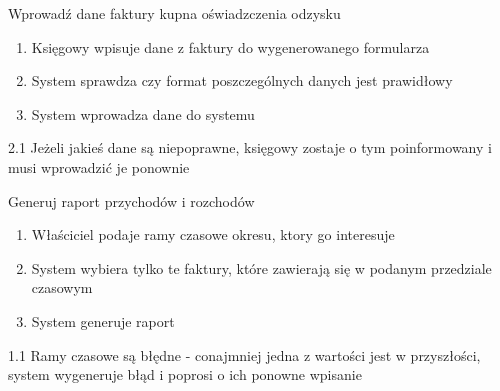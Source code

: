 	\begin{usecase}{Wprowadź dane faktury kupna oświadzczenia odzysku}
		\author{Arkadiusz Socha} 
		\maketitle
\begin{scenario}
 
			\begin{enumerate}
				\item Księgowy wpisuje dane z faktury do wygenerowanego formularza
				\item System sprawdza czy format poszczególnych danych jest prawidłowy
				\item System wprowadza dane do systemu
			\end{enumerate}
		\end{scenario}
\begin{extensions}
		2.1 Jeżeli jakieś dane są niepoprawne, księgowy zostaje o tym poinformowany i musi wprowadzić je ponownie
	\end{extensions}
\end{usecase}

	\begin{usecase}{Generuj raport przychodów i rozchodów}
		\author{Arkadiusz Socha} 
		\maketitle
\begin{scenario}
 
			\begin{enumerate}
				\item Właściciel podaje ramy czasowe okresu, ktory go interesuje
				\item System wybiera tylko te faktury, które zawierają się w podanym przedziale czasowym
				\item System generuje raport
			\end{enumerate}
		\end{scenario}
\begin{extensions}
		1.1 Ramy czasowe są błędne - conajmniej jedna z wartości jest w przyszłości, system wygeneruje błąd i poprosi o ich ponowne wpisanie
	\end{extensions}
\end{usecase}

